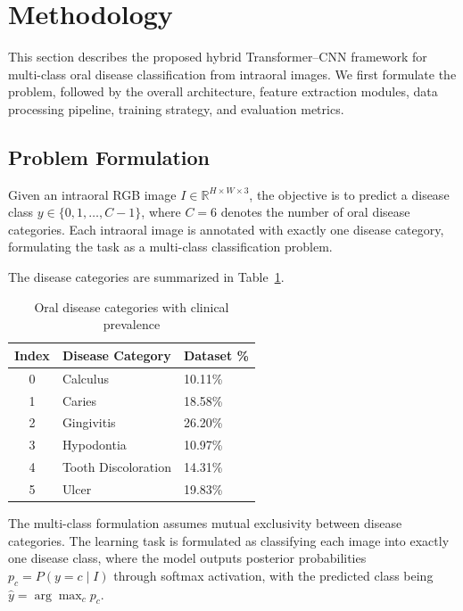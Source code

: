 \section{Methodology}
\label{sec:methodology}

This section describes the proposed hybrid Transformer--CNN framework for multi-class oral disease classification from intraoral images. We first formulate the problem, followed by the overall architecture, feature extraction modules, data processing pipeline, training strategy, and evaluation metrics.

\subsection{Problem Formulation}
\label{subsec:problem_formulation}

Given an intraoral RGB image $I \in \mathbb{R}^{H \times W \times 3}$, the objective is to predict a disease class
$y \in \{0, 1, \ldots, C-1\}$, where $C=6$ denotes the number of oral disease categories. 
Each intraoral image is annotated with exactly one disease category, formulating the task as a multi-class classification problem.

The disease categories are summarized in Table~\ref{tab:diseases}.

\begin{table}[htbp]
\centering
\caption{Oral disease categories with clinical prevalence}
\label{tab:diseases}
\begin{tabular}{cll}
\toprule
\textbf{Index} & \textbf{Disease Category} & \textbf{Dataset \%} \\
\midrule
0 & Calculus & 10.11\% \\
1 & Caries & 18.58\% \\
2 & Gingivitis & 26.20\% \\
3 & Hypodontia & 10.97\% \\
4 & Tooth Discoloration & 14.31\% \\
5 & Ulcer & 19.83\% \\
\bottomrule
\end{tabular}
\end{table}

The multi-class formulation assumes mutual exclusivity between disease categories. The learning task is formulated as classifying each image into exactly one disease class, where the model outputs posterior probabilities $p_c = P(y = c \mid I)$ through softmax activation, with the predicted class being $\hat{y} = \arg\max_c p_c$.


